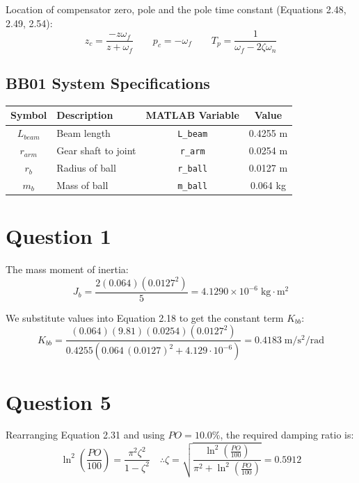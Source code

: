\documentclass[12pt]{article}
\begin{document}
Location of compensator zero, pole and the pole time constant (Equations 2.48, 2.49, 2.54):
\begin{equation*}
z_c = \frac{-z \omega_f}{z+\omega_f} \qquad p_c = -\omega_f \qquad T_p = \frac{1}{\omega_f - 2 \zeta \omega_n} 
\end{equation*}

\clearpage{}
\subsection*{BB01 System Specifications}

\begin{table}[h!]
\centering
\begin{tabular}{clcc}\toprule
Symbol      &Description    &MATLAB Variable    &Value \\ \midrule
$L_{beam}$  &Beam length    &\texttt{L\_beam}   &0.4255 m \\
$r_{arm}$   &Gear shaft to joint &\texttt{r\_arm}    &0.0254 m \\
$r_b$       &Radius of ball &\texttt{r\_ball}   &0.0127 m \\
$m_b$       &Mass of ball   &\texttt{m\_ball}   &0.064 kg \\
\bottomrule
\end{tabular}
\end{table}

\section*{Question 1}
The mass moment of inertia:
\begin{equation*}
J_b = \frac{2(0.064)({0.0127}^2)}{5} = 4.1290\times 10^{-6} \mathrm{\;kg\cdot m^2} 
\end{equation*}

We substitute values into Equation 2.18 to get the constant term $K_{bb}$:
\begin{equation*}
K_{bb} = \frac{(0.064)(9.81)(0.0254)({0.0127}^2)}{0.4255\left(0.064 \,(0.0127)^2 + 4.129\cdot10^{-6}\right)} = 0.4183 \mathrm{\;m / s^2\!/rad} 
\end{equation*}

\section*{Question 5}
Rearranging Equation 2.31 and using $PO=10.0$\%, the required damping ratio is:
\begin{equation*}
\ln^2 \left(\frac{PO}{100}\right) = \frac{\pi^2 \zeta^2}{1-\zeta^2} \quad \therefore \zeta = \sqrt{\frac{\ln^2 \left(\frac{PO}{100}\right)}{\pi^2 + \ln^2 \left(\frac{PO}{100}\right)}} = 0.5912 
\end{equation*}
\end{document}
